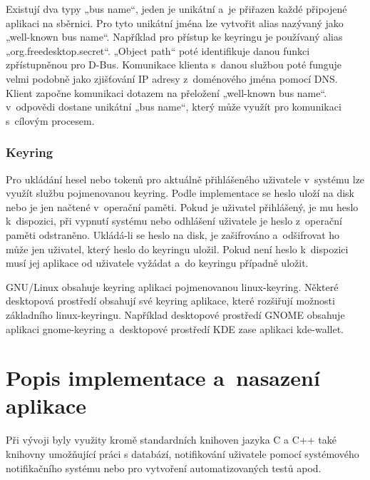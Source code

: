 Existují dva typy „bus name“, jeden je unikátní a je přiřazen každé připojené aplikaci na sběrnici. Pro tyto unikátní jména lze vytvořit alias nazývaný jako
„well-known bus name“. Například pro přístup ke keyringu je používaný alias „org.freedesktop.secret“. „Object path“ poté identifikuje danou funkci zpřístupněnou 
pro D-Bus. Komunikace klienta s danou službou poté funguje velmi podobně jako zjišťování IP adresy z doménového jména pomocí DNS. Klient započne komunikaci dotazem
na přeložení „well-known bus name“. v odpovědi dostane unikátní „bus name“, který může využít pro komunikaci s cílovým procesem. \cite{DBus}

\subsection{Keyring}

Pro ukládání hesel nebo tokenů pro aktuálně přihlášeného uživatele v systému lze využít službu pojmenovanou keyring. Podle implementace se heslo uloží na disk
nebo je jen načtené v operační paměti. Pokud je uživatel přihlášený, je mu heslo k dispozici, při vypnutí systému nebo odhlášení uživatele je heslo z operační paměti
odstraněno. Ukládá-li se heslo na disk, je zašifrováno a odšifrovat ho může jen uživatel, který heslo do keyringu uložil. Pokud není heslo k dispozici musí jej aplikace 
od uživatele vyžádat a do keyringu případně uložit. \cite{Keyring}

GNU/Linux obsahuje keyring aplikaci pojmenovanou linux-keyring. Některé desktopová prostředí obsahují své keyring aplikace, které rozšiřují možnosti základního linux-keyringu.
Například desktopové prostředí GNOME obsahuje aplikaci gnome-keyring a desktopové prostředí KDE zase aplikaci kde-wallet. \cite{Keyring}

\chapter{Popis implementace a nasazení aplikace}

Při vývoji byly využity kromě standardních knihoven jazyka C a C++ také knihovny umožňující práci s databází, notifikování uživatele pomocí 
systémového notifikačního systému nebo pro vytvoření automatizovaných testů apod.

